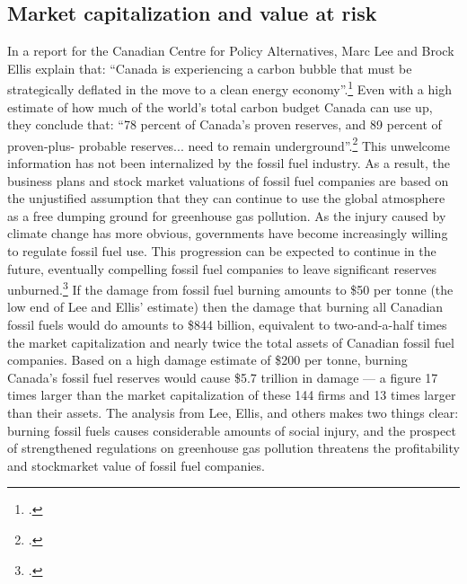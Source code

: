 \documentclass[10pt]{article}
\begin{document}
	\subsection {Market capitalization and value at risk}



In a report for the Canadian Centre for Policy Alternatives, Marc Lee and Brock Ellis explain that: ``Canada is experiencing a carbon bubble that must be strategically deflated in the move to a clean energy economy''.\footcite[][p.5]{CanadaCarbonLiabilities}
Even with a high estimate of how much of the world's total carbon budget Canada can use up, they conclude that: ``78 percent of Canada’s proven reserves, and 89 percent of proven-plus- probable reserves... need to remain underground''.\footcite[][p.6]{CanadaCarbonLiabilities}
This unwelcome information has not been internalized by the fossil fuel industry.
As a result, the business plans and stock market valuations of fossil fuel companies are based on the unjustified assumption that they can continue to use the global atmosphere as a free dumping ground for greenhouse gas pollution.
As the injury caused by climate change has more obvious, governments have become increasingly willing to regulate fossil fuel use.
This progression can be expected to continue in the future, eventually compelling fossil fuel companies to leave significant reserves unburned.\footcite[See, for instance: ][]{ThreatenGrowth}
If the damage from fossil fuel burning amounts to \$50 per tonne (the low end of Lee and Ellis' estimate) then the damage that burning all Canadian fossil fuels would do amounts to \$844 billion, equivalent to two-and-a-half times the market capitalization and nearly twice the total assets of Canadian fossil fuel companies.
Based on a high damage estimate of \$200 per tonne, burning Canada's fossil fuel reserves would cause \$5.7 trillion in damage --- a figure 17 times larger than the market capitalization of these 144 firms and 13 times larger than their assets.
The analysis from Lee, Ellis, and others makes two things clear: burning fossil fuels causes considerable amounts of social injury, and the prospect of strengthened regulations on greenhouse gas pollution threatens the profitability and stockmarket value of fossil fuel companies.
\end{document}
